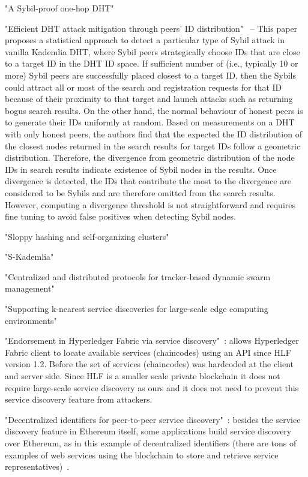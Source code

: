 "A Sybil-proof one-hop DHT"~\cite{lesniewski2008sybil}

"Efficient DHT attack mitigation through peers' ID distribution"~\cite{cholez2010efficient} – This paper proposes a statistical approach to detect a particular type of Sybil attack in vanilla Kademlia DHT, where Sybil peers strategically choose IDs that are close to a target ID in the DHT ID space. If sufficient number of (i.e., typically 10 or more) Sybil peers are successfully placed closest to a target ID, then the Sybils could attract all or most of the search and registration requests for that ID because of their proximity to that target and launch attacks such as returning bogus search results. On the other hand, the normal behaviour of honest peers is to generate their IDs uniformly at random. Based on measurements on a DHT with only honest peers, the authors find that the expected the ID distribution of the closest nodes returned in the search results for target IDs follow a geometric distribution. Therefore, the divergence from geometric distribution of the node IDs in search results indicate existence of Sybil nodes in the results. Once divergence is detected, the IDs that contribute the most to the divergence are considered to be Sybils and are therefore omitted from the search results. However, computing a divergence threshold is not straightforward and requires fine tuning to avoid false positives when detecting Sybil nodes.

"Sloppy hashing and self-organizing clusters"~\cite{freedman2003sloppy}

"S-Kademlia"~\cite{pecori2016s}

"Centralized and distributed protocols for tracker-based dynamic swarm management"~\cite{dan2012centralized}

"Supporting k-nearest service discoveries for large-scale edge computing environments"~\cite{teranishi2018supporting}

"Endorsement in Hyperledger Fabric via service discovery"~\cite{manevich2019endorsement}: allows Hyperledger Fabric client to locate available services (chaincodes) using an API since HLF version 1.2. Before the set of services (chaincodes) was hardcoded at the client and server side. Since HLF is a smaller scale private blockchain it does not require large-scale service discovery as ours and it does not need to prevent this service discovery feature from attackers.

"Decentralized identifiers for peer-to-peer service discovery"~\cite{farmer2021decentralized}: besides the service discovery feature in Ethereum itself, some applications build service discovery over Ethereum, as in this example of decentralized identifiers (there are tons of examples of web services using the blockchain to store and retrieve service representatives)~\cite{keizer2021flock}.

